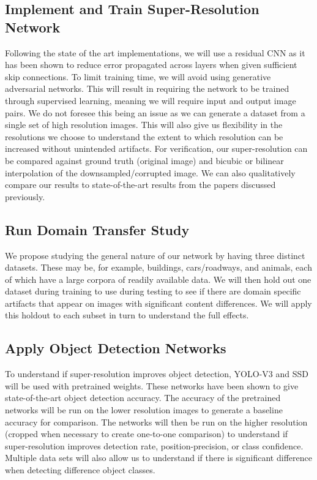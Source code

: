 \documentclass{article}
\begin{document}
\subsection{Implement and Train Super-Resolution Network}
Following the state of the art implementations, we will use a residual CNN as it has been shown to reduce error propagated across layers when given sufficient skip connections. To limit training time, we will avoid using generative adversarial networks. This will result in requiring the network to be trained through supervised learning, meaning we will require input and output image pairs. We do not foresee this being an issue as we can generate a dataset from a single set of high resolution images. This will also give us flexibility in the resolutions we choose to understand the extent to which resolution can be increased without unintended artifacts. For verification, our super-resolution can be compared against ground truth (original image) and bicubic or bilinear interpolation of the downsampled/corrupted image. We can also qualitatively compare our results to state-of-the-art results from the papers discussed previously.


\subsection{Run Domain Transfer Study}
We propose studying the general nature of our network by having three distinct datasets. These may be, for example, buildings, cars/roadways, and animals, each of which have a large corpora of readily available data. We will then hold out one dataset during training to use during testing to see if there are domain specific artifacts that appear on images with significant content differences. We will apply this holdout to each subset in turn to understand the full effects.


\subsection{Apply Object Detection Networks}
To understand if super-resolution improves object detection, YOLO-V3 and SSD will be used with pretrained weights. These networks have been shown to give state-of-the-art object detection accuracy. The accuracy of the pretrained networks will be run on the lower resolution images to generate a baseline accuracy for comparison. The networks will then be run on the higher resolution (cropped when necessary to create one-to-one comparison) to understand if super-resolution improves detection rate, position-precision, or class confidence. Multiple data sets will also allow us to understand if there is significant difference when detecting difference object classes.
\end{document}
